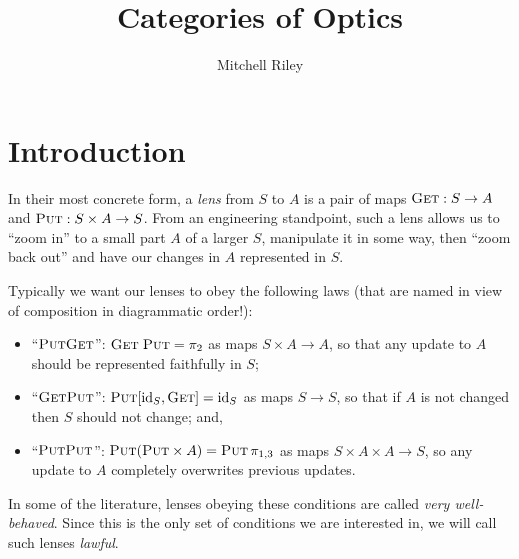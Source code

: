 \documentclass[11pt,a4paper]{article}
\title{Categories of Optics}
\author{Mitchell Riley}
\affil{Wesleyan University \\ \texttt{mvriley@wesleyan.edu}}
\theoremstyle{plain}
\theoremstyle{definition}
\newcommand{\id}{\mathrm{id}}
\newcommand{\fget}{\textsc{Get}}
\newcommand{\fput}{\textsc{Put}}
\newcommand{\todo}[1]{\textcolor{red}{\small #1}}
\begin{document}
\maketitle

\section{Introduction}


In their most concrete form, a \emph{lens} from $S$ to $A$ is a pair of maps $\fget : S \to A$ and $\fput : S \times A \to S$. From an engineering standpoint, such a lens allows us to ``zoom in'' to a small part $A$ of a larger $S$, manipulate it in some way, then ``zoom back out'' and have our changes in $A$ represented in $S$. 

Typically we want our lenses to obey the following laws (that are named in view of composition in diagrammatic order!): 
\begin{itemize}
\item ``$\fput\fget$'': $\fget \; \fput = \pi_2$ as maps $S \times A \to A$, so that any update to $A$ should be represented faithfully in $S$;
\item ``$\fget\fput$'': $\fput [\id_S, \fget] = \id_S$ as maps $S \to S$, so that if $A$ is not changed then $S$ should not change; and,
\item ``$\fput\fput$'': $\fput (\fput \times A) = \fput \, \pi_{1, 3}$ as maps $S \times A \times A \to S$, so any update to $A$ completely overwrites previous updates.
\end{itemize}
In some of the literature, lenses obeying these conditions are called \emph{very well-behaved}. Since this is the only set of conditions we are interested in, we will call such lenses \emph{lawful}.
\end{document}
